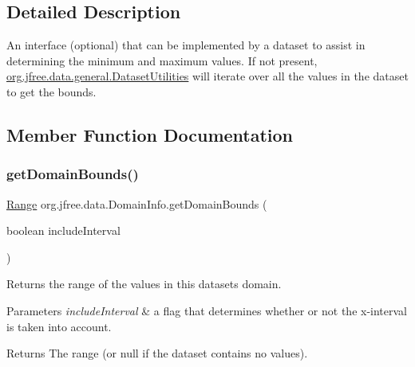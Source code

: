 \subsection{Detailed Description}
An interface (optional) that can be implemented by a dataset to assist in determining the minimum and maximum values. If not present, \mbox{\hyperlink{classorg_1_1jfree_1_1data_1_1general_1_1_dataset_utilities}{org.\+jfree.\+data.\+general.\+Dataset\+Utilities}} will iterate over all the values in the dataset to get the bounds. 

\subsection{Member Function Documentation}
\mbox{\label{interfaceorg_1_1jfree_1_1data_1_1_domain_info_aeb90c8bc6d27c82c39abc99622846732}} 
\subsubsection{\texorpdfstring{get\+Domain\+Bounds()}{getDomainBounds()}}
{\footnotesize\ttfamily \mbox{\hyperlink{classorg_1_1jfree_1_1data_1_1_range}{Range}} org.\+jfree.\+data.\+Domain\+Info.\+get\+Domain\+Bounds (\begin{DoxyParamCaption}\item[{boolean}]{include\+Interval }\end{DoxyParamCaption})}

Returns the range of the values in this dataset\textquotesingle{}s domain.


\begin{DoxyParams}{Parameters}
{\em include\+Interval} & a flag that determines whether or not the x-\/interval is taken into account.\\
\hline
\end{DoxyParams}
\begin{DoxyReturn}{Returns}
The range (or {\ttfamily null} if the dataset contains no values). 
\end{DoxyReturn}


